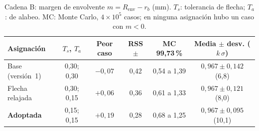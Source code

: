 \begin{table}[H]
\centering\small
\caption{Cadena B: margen de envolvente $m=R_{\text{env}}-r_b$ (mm). $T_s$: tolerancia de flecha;
$T_a$: de alabeo. MC: Monte Carlo, $4\times10^5$ casos; en ninguna asignación hubo un caso con $m<0$.}
\label{tab:fabricacion-cadenaB}
\begin{tabularx}{\textwidth}{@{}Yccccc@{}}
\toprule
\textbf{Asignación} & $T_s$, $T_a$ & \textbf{Peor caso} & \textbf{RSS} $\pm$ & \textbf{MC 99,73\,\%} & \textbf{Media $\pm$ desv. ($k\,\sigma$)}\\\midrule
Base (versión~1) & 0,30; 0,30 & $-0{,}07$ & 0,42 & 0,54 a 1,39 & $0{,}967\pm0{,}142$ (6,8)\\
Flecha relajada & 0,30; 0,15 & $+0{,}06$ & 0,36 & 0,61 a 1,33 & $0{,}967\pm0{,}121$ (8,0)\\
\textbf{Adoptada} & 0,15; 0,15 & $+0{,}19$ & 0,28 & 0,68 a 1,25 & $0{,}967\pm0{,}095$ (10,1)\\
\bottomrule
\end{tabularx}
\end{table}

